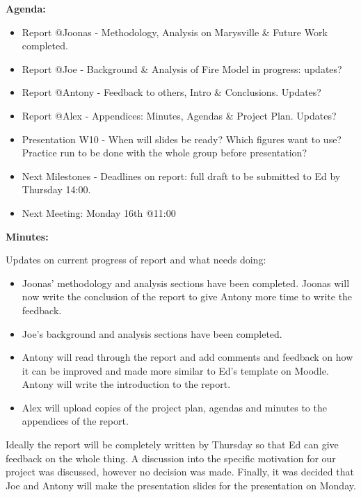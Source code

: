 \noindent \textbf{Agenda:}
\begin{itemize}
    \item Report @Joonas - Methodology, Analysis on Marysville \& Future Work completed.
    \item Report @Joe - Background \& Analysis of Fire Model in progress: updates?
    \item Report @Antony - Feedback to others, Intro \& Conclusions. Updates?
    \item Report @Alex - Appendices: Minutes, Agendas \& Project Plan. Updates?
    \item Presentation W10 - When will slides be ready? Which figures want to use? Practice run to be done with the whole group before presentation?
    \item Next Milestones - Deadlines on report: full draft to be submitted to Ed by Thursday 14:00.
    \item Next Meeting: Monday 16th @11:00
\end{itemize}
\textbf{Minutes:}

Updates on current progress of report and what needs doing: 
\begin{itemize}
    \item Joonas’ methodology and analysis sections have been completed. Joonas will now write the conclusion of the report to give Antony more time to write the feedback. 
    \item Joe’s background and analysis sections have been completed. 
    \item Antony will read through the report and add comments and feedback on how it can be improved and made more similar to Ed’s template on Moodle. Antony will write the introduction to the report.
    \item Alex will upload copies of the project plan, agendas and minutes to the appendices of the report.
\end{itemize}
Ideally the report will be completely written by Thursday so that Ed can give feedback on the whole thing.
A discussion into the specific motivation for our project was discussed, however no decision was made.
Finally, it was decided that Joe and Antony will make the presentation slides for the presentation on Monday.